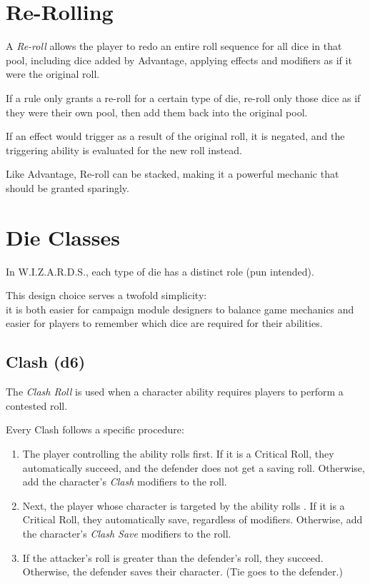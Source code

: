 \section{Re-Rolling}
A \textit{Re-roll} allows the player to redo an entire roll sequence 
for all dice in that pool, including dice added by Advantage, 
applying effects and modifiers as if it were the original roll.

\vspace{0.4em}

If a rule only grants a re-roll for a certain type of die, 
re-roll only those dice as if they were their own pool,
then add them back into the original pool.

\vspace{0.4em}

If an effect would trigger as a result of the original roll, it is negated, 
and the triggering ability is evaluated for the new roll instead.

\vspace{0.4em}

Like Advantage, Re-roll can be stacked, 
making it a powerful mechanic that should be granted sparingly.



\section{Die Classes}
In W.I.Z.A.R.D.S., each type of die has a distinct role (pun intended).

\vspace{0.4em}

This design choice serves a twofold simplicity:\\
it is both easier for campaign module designers to balance game mechanics
and easier for players to remember which dice are required for their abilities.


\subsection{Clash (d6)}
The \textit{Clash Roll} is used when a character ability requires players to perform a contested roll.

\vspace{0.4em}

Every Clash follows a specific procedure:

\begin{enumerate}
  \item The player controlling the ability rolls  first. 
  If it is a Critical Roll, they automatically succeed, 
  and the defender does not get a saving roll.
  Otherwise, add the character's \textit{Clash} modifiers to the roll.
  \item Next, the player whose character is targeted by the ability 
  rolls .
  If it is a Critical Roll, they automatically save, regardless of modifiers.
  Otherwise, add the character's \textit{Clash Save} modifiers to the roll.
  \item If the attacker's roll is greater than the defender's roll, 
  they succeed.
  Otherwise, the defender saves their character. 
  (Tie goes to the defender.)
\end{enumerate}


